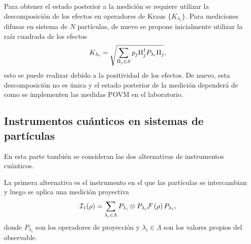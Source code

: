 \documentclass[12pt,oneside]{book}\raggedbottom{}
\begin{document}
Para obtener el estado posterior a la medición se requiere utilizar la descomposición de los efectos en operadores de Kraus $\{K_{\lambda_i}\}$. Para mediciones difusas en sistema de $N$ partículas, de nuevo se propone inicialmente  utilizar la raíz cuadrada de los efectos \begin{equation}
   K_{\lambda_i}=\sqrt{\sum_{\Pi_j \in S} p_j \Pi_{j}^{\dagger}P_{\lambda_i}\Pi_{j}},
\end{equation} esto se puede realizar debido a la positividad de los efectos. De nuevo, esta descomposición no es única y el estado posterior de la medición dependerá de como se implementen las medidas POVM en el laboratorio. 


\subsection*{Instrumentos cuánticos en sistemas de \texorpdfstring{}{N} partículas}
En esta parte también se consideran las dos alternativas de instrumentos cuánticos.


La primera alternativa es el instrumento en el que las partículas se intercambian y luego se aplica una medición proyectiva \begin{equation}\label{eq:1instrumentnp}
    \mathcal{I}_1(\rho)=\sum_{\lambda_i \in \Lambda }P_{\lambda_i}\otimes P_{\lambda_i}\mathcal{F}\left(\rho\right)P_{\lambda_i},
\end{equation} donde $P_{\lambda_i}$ son los operadores de proyección y $\lambda_i \in \Lambda$ son los valores propios del observable.  
\end{document}
